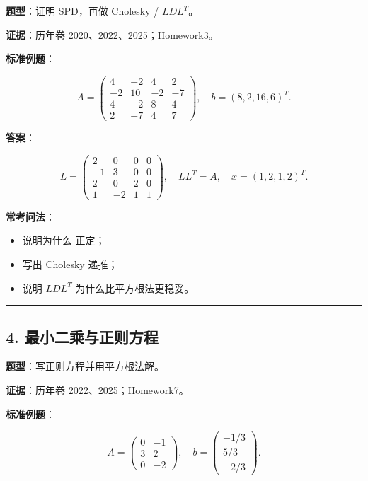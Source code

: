 \documentclass[11pt,a4paper]{ctexart}
\newcommand{\code}[1]{\begingroup\ttfamily\small #1\endgroup}
\begin{document}
\textbf{题型}：证明 SPD，再做 Cholesky / $LDL^T$。

\textbf{证据}：历年卷 2020、2022、2025；Homework3。

\textbf{标准例题}：

\[
A=\begin{pmatrix}
4&-2&4&2\\
-2&10&-2&-7\\
4&-2&8&4\\
2&-7&4&7
\end{pmatrix},\quad
b=(8,2,16,6)^T.
\]

\textbf{答案}：

\[
L=\begin{pmatrix}
2&0&0&0\\
-1&3&0&0\\
2&0&2&0\\
1&-2&1&1
\end{pmatrix},
\quad
LL^T=A,
\quad
x=(1,2,1,2)^T.
\]

\textbf{常考问法}：

\begin{itemize}

\item 说明为什么 \code{} 正定；

\item 写出 Cholesky 递推；

\item 说明 $LDL^T$ 为什么比平方根法更稳妥。

\end{itemize}

\bigskip\hrule\bigskip


\subsection*{4. 最小二乘与正则方程}


\textbf{题型}：写正则方程并用平方根法解。

\textbf{证据}：历年卷 2022、2025；Homework7。

\textbf{标准例题}：

\[
A=\begin{pmatrix}0&-1\\3&2\\0&-2\end{pmatrix},\quad
b=\begin{pmatrix}-1/3\\5/3\\-2/3\end{pmatrix}.
\]
\end{document}
